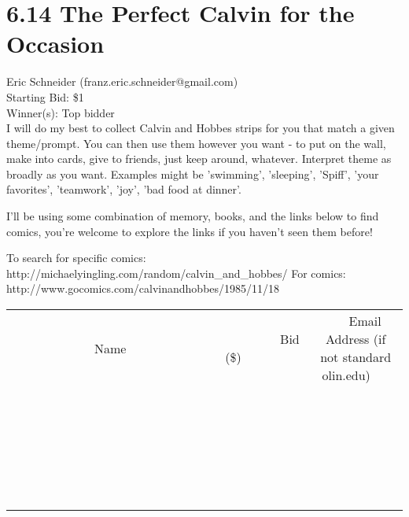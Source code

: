 \documentclass[11pt]{article}
\begin{document}
\section*{6.14 The Perfect Calvin for the Occasion}
Eric Schneider (franz.eric.schneider@gmail.com) \\
Starting Bid: \$1 \\
Winner(s): 
Top bidder \\
I will do my best to collect Calvin and Hobbes strips for you that match a given theme/prompt. You can then use them however you want - to put on the wall, make into cards, give to friends, just keep around, whatever. Interpret theme as broadly as you want. Examples might be 'swimming', 'sleeping', 'Spiff', 'your favorites', 'teamwork', 'joy', 'bad food at dinner'.

I'll be using some combination of memory, books, and the links below to find comics, you're welcome to explore the links if you haven't seen them before!

To search for specific comics: http://michaelyingling.com/random/calvin\_and\_hobbes/
For comics: http://www.gocomics.com/calvinandhobbes/1985/11/18 \\[6ex]
\begin{tabular}{c c c}
~~~~~~~~~~~~~Name~~~~~~~~~~~~~ & ~~~~~~~~~Bid (\$)~~~~~~~~~ & ~~~Email Address (if not standard olin.edu)~~~ \\
 & & \\
\hline
 & & \\
\hline
 & & \\
\hline
 & & \\
\hline
 & & \\
\hline
 & & \\
\hline
 & & \\
\hline
 & & \\
\hline
 & & \\
\hline
 & & \\
\hline
 & & \\
\hline
 & & \\
\hline
 & & \\
\hline
 & & \\
\hline
 & & \\
\hline
 & & \\
\hline
 & & \\
\hline
 & & \\
\hline
 & & \\
\hline
 & & \\
\hline
 & & \\
\hline
 & & \\
\hline
 & & \\
\hline
 & & \\
\hline
 & & \\
\hline
 & & \\
\hline
\end{tabular}
\clearpage
\end{document}
